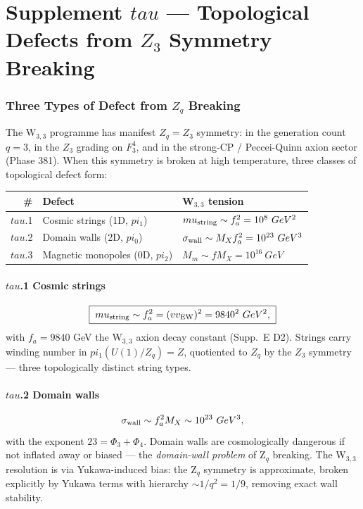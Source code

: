 \documentclass[12pt,a4paper]{article}
\def\mathbb#1{#1}%
\def\mathrm#1{#1}%
\def\text#1{#1}%
\def\mu{mu}%
\def\Phi#1{Phi#1}%
\def\pi{pi}%
\def\tau{tau}%
\def\cdot{ }%
\theoremstyle{definition}
\newcommand{\FF}{\mathbb{F}}
\newcommand{\ZZ}{\mathbb{Z}}
\begin{document}
\part*{\texorpdfstring{Supplement $\tau$ --- Topological Defects from $\ZZ_3$ Symmetry Breaking}{Supplement tau --- Topological Defects from Z3 Symmetry Breaking}}

\section*{Three Types of Defect from $\ZZ_q$ Breaking}

The W$_{3,3}$ programme has manifest $\ZZ_q = \ZZ_3$ symmetry: in the
generation count $q = 3$, in the $\ZZ_3$ grading on $\FF_3^4$, and in
the strong-CP / Peccei-Quinn axion sector (Phase 381). When this
symmetry is broken at high temperature, three classes of
topological defect form:

\begin{center}
\renewcommand{\arraystretch}{1.4}
\begin{tabular}{rll}
\toprule
\# & Defect & W$_{3,3}$ tension \\
\midrule
$\tau$.1 & Cosmic strings (1D, $\pi_1$) & $\mu_{\rm string}\sim f_a^2 = 10^8\ \text{GeV}^2$ \\
$\tau$.2 & Domain walls (2D, $\pi_0$) & $\sigma_{\rm wall}\sim M_X f_a^2 = 10^{23}\ \text{GeV}^3$ \\
$\tau$.3 & Magnetic monopoles (0D, $\pi_2$) & $M_m\sim f\cdot M_X = 10^{16}\ \text{GeV}$ \\
\bottomrule
\end{tabular}
\end{center}

\subsection*{$\tau$.1 \quad Cosmic strings}
\[
\boxed{\;\mu_{\rm string} \sim f_a^2 = (v\cdot v_{\rm EW})^2 = 9840^2\ \text{GeV}^2,\;}
\]
with $f_a = 9840$ GeV the W$_{3,3}$ axion decay constant
(Supp.~E D2). Strings carry winding number in $\pi_1(\mathrm{U}(1)/\ZZ_q) = \ZZ$,
quotiented to $\ZZ_q$ by the $\ZZ_3$ symmetry — three topologically
distinct string types.

\subsection*{$\tau$.2 \quad Domain walls}
\[
\sigma_{\rm wall} \sim f_a^2 \cdot M_X \sim 10^{23}\ \text{GeV}^3,
\]
with the exponent $23 = \Phi_3 + \Phi_4$. Domain walls are
cosmologically dangerous if not inflated away or biased — the
\emph{domain-wall problem} of Z$_q$ breaking. The W$_{3,3}$ resolution
is via Yukawa-induced bias: the Z$_q$ symmetry is approximate, broken
explicitly by Yukawa terms with hierarchy $\sim 1/q^2 = 1/9$, removing
exact wall stability.
\end{document}

